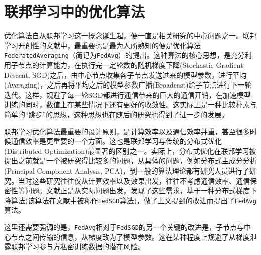 \section{联邦学习中的优化算法}
\label{sec:chap2-overview}

优化算法自从联邦学习这一概念诞生起，便一直是相关研究的中心问题之一。联邦学习开创性的文献\cite{mcmahan2017fed_avg}中，最重要也是最为人所熟知的便是优化算法\texttt{FederatedAveraging}（简记为\texttt{FedAvg}）的提出。这种算法的核心思想，是充分利用子节点的计算能力，在执行完一定轮数的随机梯度下降(Stochastic Gradient Descent, SGD)之后，由中心节点收集各子节点发送过来的模型参数，进行平均(Averaging)，之后再将平均之后的模型参数广播(Broadcast)给子节点进行下一轮迭代。这样，规避了每一轮SGD都进行通信带来的巨大的通信开销，在加速模型训练的同时，数值上在某些情况下还有更好的收敛性。这实际上是一种比较朴素与简单的``跳步''的思想，这种思想也在随后的研究\cite{zhang2020fedpd, proxskip, proxskip-vr}也得到了进一步的发展。

联邦学习优化算法最重要的设计原则，是计算效率以及通信效率并重，甚至很多时候通信效率是更重要的一个方面。这也是联邦学习与传统的分布式优化(Distributed Optimization)最显著的区别之一。实际上，分布式优化在联邦学习被提出之前就是一个被研究得比较多的问题，从具体的问题，例如分布式主成分分析(Principal Component Analysis, PCA)\cite{dist_pca_2014_nips}，到一般的算法理论\cite{boyd2011distributed}都有研究人员进行了研究。当时这些研究往往仅从计算效率以及效果出发，往往不考虑通信效率、通信保密性等问题。文献\cite{mcmahan2017fed_avg}正是从实际问题出发，发现了这些需求，基于一种分布式梯度下降算法\cite{chen2016_revisit}(该算法在文献\cite{mcmahan2017fed_avg}中被称作\texttt{FedSGD}算法)，做了上文提到的改进而提出了\texttt{FedAvg}算法。

这里还需要强调的是，\texttt{FedAvg}相对于\texttt{FedSGD}的另一个关键的改进是，子节点与中心节点之间传输的信息，从梯度改为了模型参数。这在某种程度上规避了从梯度泄露联邦学习参与方私密训练数据\cite{zhu2019deep_leakage}的潜在风险。

